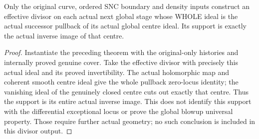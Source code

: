 \begin{theorem}
\label{hir:sharp-actual-curve-original-successor-centre-divisor}
\leanok
Only the original curve, ordered SNC boundary and density inputs construct
an effective divisor on each actual next global stage whose WHOLE ideal
is the actual successor pullback of its actual global centre ideal. Its
support is exactly the actual inverse image of that centre.
\end{theorem}
\begin{proof}
Instantiate the preceding theorem with the original-only histories and
internally proved genuine cover. Take the effective divisor with precisely
this actual ideal and its proved invertibility. The actual holomorphic
map and coherent smooth centre ideal give the whole pullback zero-locus
identity; the vanishing ideal of the genuinely closed centre cuts out
exactly that centre. Thus the support is its entire actual inverse image.
This does not identify this support with the differential exceptional
locus or prove the global blowup universal property. Those require further
actual geometry; no such conclusion is included in this divisor output.
\end{proof}

